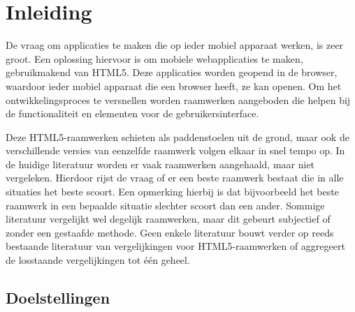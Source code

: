 \chapter{Inleiding} %
\label{inleiding}

De vraag om applicaties te maken die op ieder mobiel apparaat werken, is zeer groot.
Een oplossing hiervoor is om mobiele webapplicaties te maken, gebruikmakend van HTML5.
Deze applicaties worden geopend in de browser, waardoor ieder mobiel apparaat die een browser heeft, ze kan openen.
Om het ontwikkelingsproces te versnellen worden raamwerken aangeboden die helpen bij de functionaliteit en elementen voor de gebruikersinterface. 

Deze HTML5-raamwerken schieten als paddenstoelen uit de grond, maar ook de verschillende versies van eenzelfde raamwerk volgen elkaar in snel tempo op.
In de huidige literatuur worden er vaak raamwerken aangehaald, maar niet vergeleken.
Hierdoor rijst de vraag of er een beste raamwerk bestaat die in alle situaties het beste scoort.
Een opmerking hierbij is dat bijvoorbeeld het beste raamwerk in een bepaalde situatie slechter scoort dan een ander.
Sommige literatuur vergelijkt wel degelijk raamwerken, maar dit gebeurt subjectief of zonder een gestaafde methode.
Geen enkele literatuur bouwt verder op reeds bestaande literatuur van vergelijkingen voor HTML5-raamwerken of aggregeert de losstaande vergelijkingen tot één geheel.

\section{Doelstellingen} %

